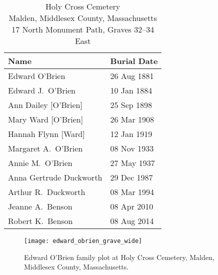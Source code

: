 \begin{table}[ht]
	\centering
	\caption{Holy Cross Cemetery\cite{HolyCrossPlotEdward:2} \\
		Malden, Middlesex County, Massachusetts
		17 North Monument Path, Graves 32--34 East}
	\begin{tabular}{|l|l|}
		\hline
		\textbf{Name} & \textbf{Burial Date} \\
	\hline
	Edward O'Brien\index{O'Brien!Edward/Edmund\textsuperscript{2}} & 26 Aug 1881 \\
	\hline
	Edward J.\ O'Brien\index{O'Brien!Edward\textsuperscript{3} (1861--1884)} & 10 Jan 1884 \\
	\hline
	Ann Dailey [O'Brien]\index{O'Brien!Ann\textsuperscript{2}}\index{Dailey!Ann\textsuperscript{2} (O'Brien)} & 25 Sep 1898 \\
	\hline
	Mary Ward [O'Brien]\index{O'Brien!Mary\textsuperscript{2}}\index{Ward!Mary\textsuperscript{2} (O'Brien)} & 26 Mar 1908 \\
	\hline
	Hannah Flynn [Ward]\index{Ward!Hannah/Hanora\textsuperscript{3}}\index{Flynn!Hannah/Hanora\textsuperscript{3} (Ward)} & 12 Jan 1919 \\
	\hline
	Margaret A.\ O'Brien\index{O'Brien!Margaret A.\textsuperscript{3} (1859--1933)} & 08 Nov 1933 \\
	\hline
	Annie M.\ O'Brien\index{O'Brien!Ann\textsuperscript{3}} & 27 May 1937 \\
	\hline
	Anna Gertrude Duckworth\index{Duckworth!Anna Gertrude} & 29 Dec 1987 \\
	\hline
	Arthur R.\ Duckworth\index{Duckworth!Arthur R.} & 08 Mar 1994 \\
	\hline
	Jeanne A.\ Benson\index{Benson!Jeanne A.} & 08 Apr 2010 \\
	\hline
	Robert K.\ Benson\index{Benson!Robert K.} & 08 Aug 2014 \\
	\hline
	\end{tabular}
\end{table}

\begin{figure}
	\centering
	\texttt{[image: edward\_obrien\_grave\_wide]}
	\caption{Edward O'Brien family plot at Holy Cross Cemetery, Malden, Middlesex County, Massachusetts.}
	\label{fig:EdwardOBrienGrave}
\end{figure}


